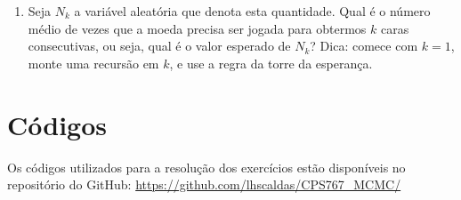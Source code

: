 \documentclass[12 pt]{article}
\begin{document}
\begin{enumerate}
    \item Seja $N_k$ a variável aleatória que denota esta quantidade. Qual é o número médio de vezes que a moeda precisa ser jogada para obtermos $k$ caras consecutivas, ou seja, qual é o valor esperado de $N_k$? Dica: comece com $k = 1$, monte uma recursão em $k$, e use a regra da torre da esperança.
    \begin{tcolorbox}[colframe=black, title=Resposta:]

    \end{tcolorbox}
\end{enumerate}

\section*{Códigos}

Os códigos utilizados para a resolução dos exercícios estão disponíveis no repositório do GitHub: \url{https://github.com/lhscaldas/CPS767_MCMC/}

\end{document}
